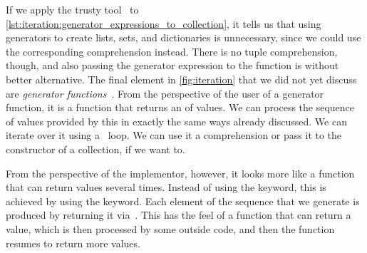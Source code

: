 If we apply the trusty tool \ruff\ to \cref{lst:iteration:generator_expressions_to_collection}, it tells us that using generators to create lists, sets, and dictionaries is unnecessary, since we could use the corresponding comprehension instead.
There is no tuple comprehension, though, and also passing the generator expression to the  function is without better alternative.%
%
%
%
%
\FloatBarrier%
\endhsection%
%
%
%
%
%
%
%
%
%
%
%
The final element in \cref{fig:iteration} that we did not yet discuss are \emph{generator functions}~\cite{PEP255}.
From the perspective of the user of a generator function, it is a function that returns an  of values.
We can process the sequence of values provided by this  in exactly the same ways already discussed.
We can iterate over it using a ~loop.
We can use it a comprehension or pass it to the constructor of a collection, if we want to.

From the perspective of the implementor, however, it looks more like a function that can return values several times.
Instead of using the  keyword, this is achieved by using the  keyword.
Each element of the sequence that we generate is produced by returning it via~.
This has the feel of a function that can return a value, which is then processed by some outside code, and then the function resumes to return more values.

